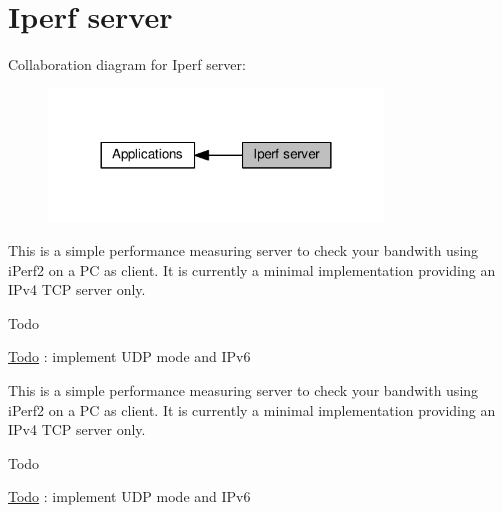 \hypertarget{group__iperf}{}\section{Iperf server}
\label{group__iperf}
Collaboration diagram for Iperf server\+:
\nopagebreak
\begin{figure}[H]
\begin{center}
\leavevmode
\includegraphics[width=252pt]{group__iperf}
\end{center}
\end{figure}
This is a simple performance measuring server to check your bandwith using i\+Perf2 on a PC as client. It is currently a minimal implementation providing an I\+Pv4 T\+CP server only.

\begin{DoxyRefDesc}{Todo}
\item[\hyperlink{todo__todo000002}{Todo}]\+: implement U\+DP mode and I\+Pv6 \end{DoxyRefDesc}


This is a simple performance measuring server to check your bandwith using i\+Perf2 on a PC as client. It is currently a minimal implementation providing an I\+Pv4 T\+CP server only.

\begin{DoxyRefDesc}{Todo}
\item[\hyperlink{todo__todo000013}{Todo}]\+: implement U\+DP mode and I\+Pv6 \end{DoxyRefDesc}
